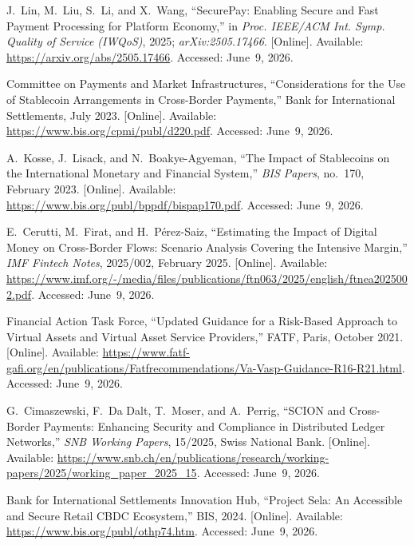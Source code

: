 \documentclass[12pt, a4paper]{report}
\begin{document}
{\begin{enumerate}[label={[\arabic*]}]
\item J.~Lin, M.~Liu, S.~Li, and X.~Wang, ``SecurePay: Enabling Secure and Fast Payment Processing for Platform Economy,'' in \textit{Proc. IEEE/ACM Int. Symp. Quality of Service (IWQoS)}, 2025; \textit{arXiv:2505.17466}. [Online]. Available: \url{https://arxiv.org/abs/2505.17466}. Accessed: June~9, 2026.

\item Committee on Payments and Market Infrastructures, ``Considerations for the Use of Stablecoin Arrangements in Cross-Border Payments,'' Bank for International Settlements, July 2023. [Online]. Available: \url{https://www.bis.org/cpmi/publ/d220.pdf}. Accessed: June~9, 2026.

\item A.~Kosse, J.~Lisack, and N.~Boakye-Agyeman, ``The Impact of Stablecoins on the International Monetary and Financial System,'' \textit{BIS Papers}, no.~170, February 2023. [Online]. Available: \url{https://www.bis.org/publ/bppdf/bispap170.pdf}. Accessed: June~9, 2026.

\item E.~Cerutti, M.~Firat, and H.~P\'{e}rez-Saiz, ``Estimating the Impact of Digital Money on Cross-Border Flows: Scenario Analysis Covering the Intensive Margin,'' \textit{IMF Fintech Notes}, 2025/002, February 2025. [Online]. Available: \url{https://www.imf.org/-/media/files/publications/ftn063/2025/english/ftnea2025002.pdf}. Accessed: June~9, 2026.

\item Financial Action Task Force, ``Updated Guidance for a Risk-Based Approach to Virtual Assets and Virtual Asset Service Providers,'' FATF, Paris, October 2021. [Online]. Available: \url{https://www.fatf-gafi.org/en/publications/Fatfrecommendations/Va-Vasp-Guidance-R16-R21.html}. Accessed: June~9, 2026.

\item G.~Cimaszewski, F.~Da Dalt, T.~Moser, and A.~Perrig, ``SCION and Cross-Border Payments: Enhancing Security and Compliance in Distributed Ledger Networks,'' \textit{SNB Working Papers}, 15/2025, Swiss National Bank. [Online]. Available: \url{https://www.snb.ch/en/publications/research/working-papers/2025/working_paper_2025_15}. Accessed: June~9, 2026.

\item Bank for International Settlements Innovation Hub, ``Project Sela: An Accessible and Secure Retail CBDC Ecosystem,'' BIS, 2024. [Online]. Available: \url{https://www.bis.org/publ/othp74.htm}. Accessed: June~9, 2026.
\end{enumerate}
}
\end{document}
